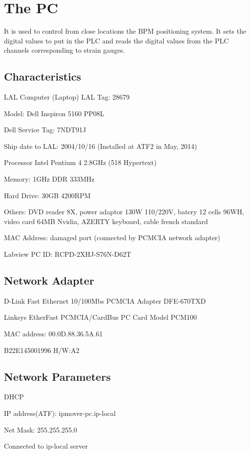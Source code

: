 \section{The PC}
It is used to control from close locations the BPM positioning system. It sets the digital values to put in the PLC and reads the digital values from the PLC channels corresponding to strain gauges.\par
\subsection{Characteristics}
LAL Computer (Laptop)
LAL Tag: 28679\par
Model: Dell Inspiron 5160 PP08L\par
Dell Service Tag: 7NDT91J\par
Ship date to LAL: 2004/10/16 (Installed at ATF2 in May, 2014)\par
Processor Intel Pentium 4 2.8GHz (518 Hypertext)\par
Memory: 1GHz DDR 333MHz\par
Hard Drive: 30GB 4200RPM\par
Others: DVD reader 8X, power adaptor 130W 110/220V, batery 12 cells 96WH, video card 64MB Nvidia, AZERTY keyboard, cable french standard\par
MAC Address: damaged port (connected by PCMCIA network adapter)\par
Labview PC ID: RCPD-2XHJ-S76N-D62T

\subsection{Network Adapter}
D-Link Fast Ethernet 10/100Mbs PCMCIA Adapter DFE-670TXD\par
Linksys EtherFast PCMCIA/CardBus PC Card Model PCM100\par
MAC address: 00.0D.88.36.5A.61\par
B22E145001996 H/W:A2

\subsection{Network Parameters}
DHCP\par
IP address(ATF): ipmover-pc.ip-local\par
Net Mask: 255.255.255.0\par
Connected to ip-local server\par

